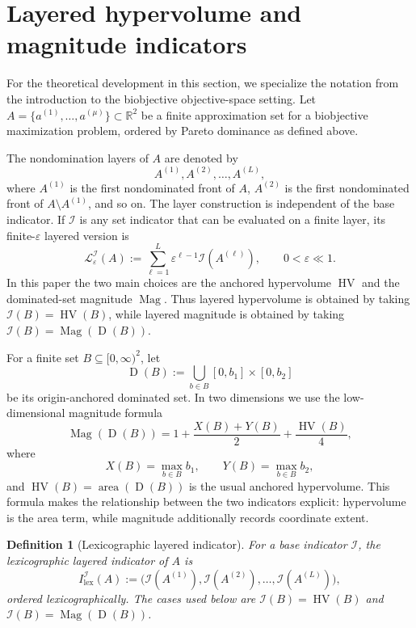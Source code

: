 \documentclass{article}
\newtheorem{definition}{Definition}
\newcommand{\Mag}{\operatorname{Mag}}
\newcommand{\HV}{\operatorname{HV}}
\newcommand{\R}{\mathbb{R}}
\newcommand{\front}[1]{A^{(#1)}}
\newcommand{\Dom}{\operatorname{D}}
\begin{document}
\section{Layered hypervolume and magnitude indicators}
For the theoretical development in this section, we specialize the notation from the introduction to the biobjective objective-space setting. Let $A=\{a^{(1)},\dots,a^{(\mu)}\}\subset \R^2$ be a finite approximation set for a biobjective maximization problem, ordered by Pareto dominance as defined above.

The nondomination layers of $A$ are denoted by
\[
\front{1},\front{2},\dots,\front{L},
\]
where $\front{1}$ is the first nondominated front of $A$, $\front{2}$ is the first nondominated front of $A\setminus \front{1}$, and so on.  The layer construction is independent of the base indicator.  If $\mathcal I$ is any set indicator that can be evaluated on a finite layer, its finite-$\varepsilon$ layered version is
\[
\mathcal L_{\varepsilon}^{\mathcal I}(A)
 :=\sum_{\ell=1}^{L}\varepsilon^{\ell-1}\mathcal I(\front{\ell}),
 \qquad 0<\varepsilon\ll 1.
\]
In this paper the two main choices are the anchored hypervolume $\HV$ and the dominated-set magnitude $\Mag$.  Thus layered hypervolume is obtained by taking $\mathcal I(B)=\HV(B)$, while layered magnitude is obtained by taking $\mathcal I(B)=\Mag(\Dom(B))$.

For a finite set $B\subseteq [0,\infty)^2$, let
\[
\Dom(B):=\bigcup_{b\in B}[0,b_1]\times[0,b_2]
\]
be its origin-anchored dominated set. In two dimensions we use the low-dimensional magnitude formula
\[
\Mag(\Dom(B))=1+\frac{X(B)+Y(B)}{2}+\frac{\HV(B)}{4},
\]
where
\[
X(B)=\max_{b\in B} b_1,
\qquad
Y(B)=\max_{b\in B} b_2,
\]
and $\HV(B)=\operatorname{area}(\Dom(B))$ is the usual anchored hypervolume.  This formula makes the relationship between the two indicators explicit: hypervolume is the area term, while magnitude additionally records coordinate extent.

\begin{definition}[Lexicographic layered indicator]
For a base indicator $\mathcal I$, the lexicographic layered indicator of $A$ is
\[
I^{\mathcal I}_{\mathrm{lex}}(A):=
\bigl(\mathcal I(\front{1}),\mathcal I(\front{2}),\dots,\mathcal I(\front{L})\bigr),
\]
ordered lexicographically.  The cases used below are $\mathcal I(B)=\HV(B)$ and $\mathcal I(B)=\Mag(\Dom(B))$.
\end{definition}
\end{document}

